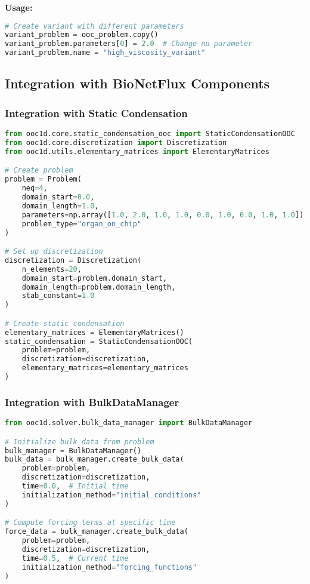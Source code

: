 \textbf{Usage:}
\begin{lstlisting}[language=Python]
# Create variant with different parameters
variant_problem = ooc_problem.copy()
variant_problem.parameters[0] = 2.0  # Change nu parameter
variant_problem.name = "high_viscosity_variant"
\end{lstlisting}

\subsection{Integration with BioNetFlux Components}
\label{subsec:problem_integration}

\subsubsection{Integration with Static Condensation}

\begin{lstlisting}[language=Python, caption=Static Condensation Integration]
from ooc1d.core.static_condensation_ooc import StaticCondensationOOC
from ooc1d.core.discretization import Discretization
from ooc1d.utils.elementary_matrices import ElementaryMatrices

# Create problem
problem = Problem(
    neq=4,
    domain_start=0.0,
    domain_length=1.0,
    parameters=np.array([1.0, 2.0, 1.0, 1.0, 0.0, 1.0, 0.0, 1.0, 1.0]),
    problem_type="organ_on_chip"
)

# Set up discretization
discretization = Discretization(
    n_elements=20,
    domain_start=problem.domain_start,
    domain_length=problem.domain_length,
    stab_constant=1.0
)

# Create static condensation
elementary_matrices = ElementaryMatrices()
static_condensation = StaticCondensationOOC(
    problem=problem,
    discretization=discretization, 
    elementary_matrices=elementary_matrices
)
\end{lstlisting}

\subsubsection{Integration with BulkDataManager}

\begin{lstlisting}[language=Python, caption=BulkDataManager Integration]
from ooc1d.solver.bulk_data_manager import BulkDataManager

# Initialize bulk data from problem
bulk_manager = BulkDataManager()
bulk_data = bulk_manager.create_bulk_data(
    problem=problem,
    discretization=discretization,
    time=0.0,  # Initial time
    initialization_method="initial_conditions"
)

# Compute forcing terms at specific time
force_data = bulk_manager.create_bulk_data(
    problem=problem,
    discretization=discretization, 
    time=0.5,  # Current time
    initialization_method="forcing_functions"
)
\end{lstlisting}

